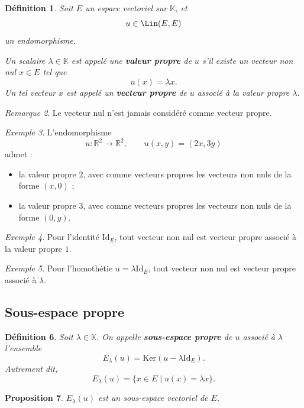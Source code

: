 \documentclass[11pt,a4paper]{article}
\newtheorem{definition}{Définition}[section]
\newtheorem{proposition}[definition]{Proposition}
\theoremstyle{remark}
\newtheorem{remarque}[definition]{Remarque}
\newtheorem{exemple}[definition]{Exemple}
\newcommand{\R}{\mathbb{R}}
\newcommand{\K}{\mathbb{K}}
\newcommand{\Ker}{\mathrm{Ker}}
\newcommand{\id}{\mathrm{Id}}
\begin{document}
\begin{definition}
Soit \(E\) un espace vectoriel sur \(\K\), et
\[
u\in\Lin(E,E)
\]
un endomorphisme.

Un scalaire \(\lambda\in\K\) est appelé une \textbf{valeur propre} de \(u\) s’il existe un vecteur non nul \(x\in E\) tel que
\[
u(x)=\lambda x.
\]
Un tel vecteur \(x\) est appelé un \textbf{vecteur propre} de \(u\) associé à la valeur propre \(\lambda\).
\end{definition}

\begin{remarque}
Le vecteur nul n’est jamais considéré comme vecteur propre.
\end{remarque}

\begin{exemple}
L’endomorphisme
\[
u:\R^2\to\R^2,\qquad u(x,y)=(2x,3y)
\]
admet :
\begin{itemize}
    \item la valeur propre \(2\), avec comme vecteurs propres les vecteurs non nuls de la forme \((x,0)\) ;
    \item la valeur propre \(3\), avec comme vecteurs propres les vecteurs non nuls de la forme \((0,y)\).
\end{itemize}
\end{exemple}

\begin{exemple}
Pour l’identité \(\id_E\), tout vecteur non nul est vecteur propre associé à la valeur propre \(1\).
\end{exemple}

\begin{exemple}
Pour l’homothétie \(u=\lambda \id_E\), tout vecteur non nul est vecteur propre associé à \(\lambda\).
\end{exemple}

\subsection{Sous-espace propre}

\begin{definition}
Soit \(\lambda\in\K\). On appelle \textbf{sous-espace propre} de \(u\) associé à \(\lambda\) l’ensemble
\[
E_\lambda(u)=\Ker(u-\lambda\id_E).
\]
Autrement dit,
\[
E_\lambda(u)=\{x\in E\mid u(x)=\lambda x\}.
\]
\end{definition}

\begin{proposition}
\(E_\lambda(u)\) est un sous-espace vectoriel de \(E\).
\end{proposition}
\end{document}
